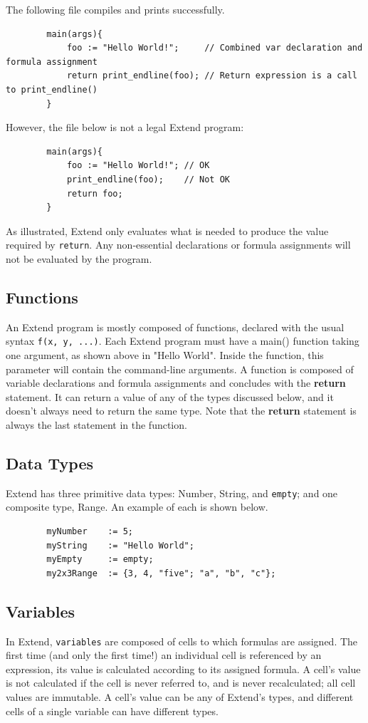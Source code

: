 	\medskip \noindent The following file compiles and prints successfully.

	\begin{lstlisting}
		main(args){
			foo := "Hello World!";     // Combined var declaration and formula assignment
			return print_endline(foo); // Return expression is a call to print_endline()
		}
	\end{lstlisting}

	\medskip \noindent However, the file below is not a legal Extend program:

	\begin{lstlisting}
		main(args){
			foo := "Hello World!"; // OK
			print_endline(foo);    // Not OK
			return foo;
		}
	\end{lstlisting}

	\medskip \noindent As illustrated, Extend only evaluates what is needed to produce the value required by \texttt{return}. Any non-essential declarations or formula assignments will not be evaluated by the program.

	\subsection{Functions}
	An Extend program is mostly composed of functions, declared with the usual syntax \texttt{f(x, y, ...)}. Each Extend program must have a main() function taking one argument, as shown above in "Hello World". Inside the function, this parameter will contain the command-line arguments. A function is composed of variable declarations and formula assignments and concludes with the \textbf{return} statement. It can return a value of any of the types discussed below, and it doesn't always need to return the same type.
	Note that the \textbf{return} statement is always the last statement in the function.

	\subsection{Data Types}
	Extend has three primitive data types: Number, String, and \texttt{empty}; and one composite type, Range. An example of each is shown below.

	\begin{lstlisting}
		myNumber    := 5;
		myString    := "Hello World";
		myEmpty     := empty;
		my2x3Range  := {3, 4, "five"; "a", "b", "c"};
	\end{lstlisting}

	\subsection{Variables}
	In Extend, \texttt{variables} are composed of cells to which formulas are assigned. The first time (and only the first time!) an individual cell is referenced by an expression, its value is calculated according to its assigned formula. A cell's value is not calculated if the cell is never referred to, and is never recalculated; all cell values are immutable. A cell's value can be any of Extend's types, and different cells of a single variable can have different types.

